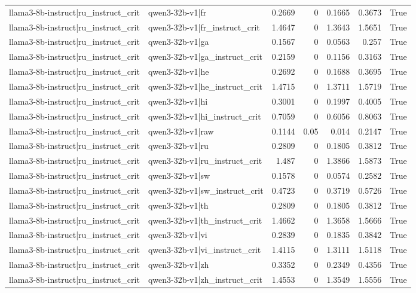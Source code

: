 \begin{table}
\begin{tabular}{l l r r r r l}
llama3-8b-instruct|ru_instruct_crit & qwen3-32b-v1|fr & 0.2669 & 0 & 0.1665 & 0.3673 & True \\
llama3-8b-instruct|ru_instruct_crit & qwen3-32b-v1|fr_instruct_crit & 1.4647 & 0 & 1.3643 & 1.5651 & True \\
llama3-8b-instruct|ru_instruct_crit & qwen3-32b-v1|ga & 0.1567 & 0 & 0.0563 & 0.257 & True \\
llama3-8b-instruct|ru_instruct_crit & qwen3-32b-v1|ga_instruct_crit & 0.2159 & 0 & 0.1156 & 0.3163 & True \\
llama3-8b-instruct|ru_instruct_crit & qwen3-32b-v1|he & 0.2692 & 0 & 0.1688 & 0.3695 & True \\
llama3-8b-instruct|ru_instruct_crit & qwen3-32b-v1|he_instruct_crit & 1.4715 & 0 & 1.3711 & 1.5719 & True \\
llama3-8b-instruct|ru_instruct_crit & qwen3-32b-v1|hi & 0.3001 & 0 & 0.1997 & 0.4005 & True \\
llama3-8b-instruct|ru_instruct_crit & qwen3-32b-v1|hi_instruct_crit & 0.7059 & 0 & 0.6056 & 0.8063 & True \\
llama3-8b-instruct|ru_instruct_crit & qwen3-32b-v1|raw & 0.1144 & 0.05 & 0.014 & 0.2147 & True \\
llama3-8b-instruct|ru_instruct_crit & qwen3-32b-v1|ru & 0.2809 & 0 & 0.1805 & 0.3812 & True \\
llama3-8b-instruct|ru_instruct_crit & qwen3-32b-v1|ru_instruct_crit & 1.487 & 0 & 1.3866 & 1.5873 & True \\
llama3-8b-instruct|ru_instruct_crit & qwen3-32b-v1|sw & 0.1578 & 0 & 0.0574 & 0.2582 & True \\
llama3-8b-instruct|ru_instruct_crit & qwen3-32b-v1|sw_instruct_crit & 0.4723 & 0 & 0.3719 & 0.5726 & True \\
llama3-8b-instruct|ru_instruct_crit & qwen3-32b-v1|th & 0.2809 & 0 & 0.1805 & 0.3812 & True \\
llama3-8b-instruct|ru_instruct_crit & qwen3-32b-v1|th_instruct_crit & 1.4662 & 0 & 1.3658 & 1.5666 & True \\
llama3-8b-instruct|ru_instruct_crit & qwen3-32b-v1|vi & 0.2839 & 0 & 0.1835 & 0.3842 & True \\
llama3-8b-instruct|ru_instruct_crit & qwen3-32b-v1|vi_instruct_crit & 1.4115 & 0 & 1.3111 & 1.5118 & True \\
llama3-8b-instruct|ru_instruct_crit & qwen3-32b-v1|zh & 0.3352 & 0 & 0.2349 & 0.4356 & True \\
llama3-8b-instruct|ru_instruct_crit & qwen3-32b-v1|zh_instruct_crit & 1.4553 & 0 & 1.3549 & 1.5556 & True \\

\end{tabular}
\end{table}
